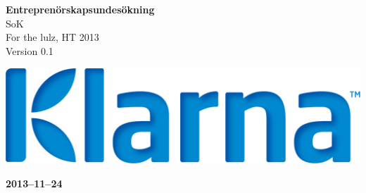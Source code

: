 \documentclass[pdftex, fontsize=11pt, a4paper]{scrbook}
\begin{document}
\begin{titlepage}
\thispagestyle{empty}
\begin{center}
	\vspace*{4\baselineskip}

	\textbf{\huge Entreprenörskapsundesökning} \\
	\vspace*{0.5\baselineskip}
	{\large  SoK} \\
	\vspace*{0.5\baselineskip}
	{\large  For the lulz, HT 2013} \\
	\vspace*{0.5\baselineskip}
	{\large  Version 0.1}


	\vspace*{6\baselineskip}
	\includegraphics[width=\linewidth]{KlarnaLogo}


	\normalfont
	\small
	\vfill


	\vspace*{2\baselineskip}

	\textbf{2013--11--24} \\
	[2\baselineskip]
\end{center}

\end{titlepage}
\end{document}
